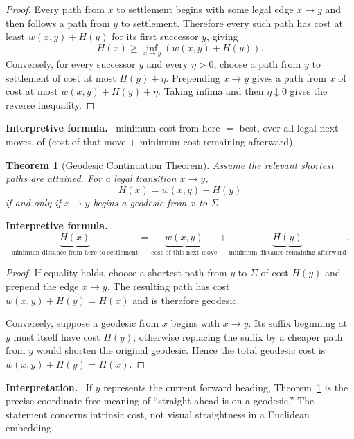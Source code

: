 \documentclass[11pt]{article}
\newtheorem{theorem}{Theorem}[section]
\theoremstyle{definition}
\theoremstyle{remark}
\newcommand{\Sett}{\Sigma}
\newenvironment{interpretiveformula}{%
  \begin{center}\begin{minipage}{0.92\textwidth}\small
  \textbf{Interpretive formula.}\ }{\end{minipage}\end{center}}
\newenvironment{interpretation}{%
  \begin{center}\begin{minipage}{0.92\textwidth}\small
  \textbf{Interpretation.}\ }{\end{minipage}\end{center}}
\begin{document}
\begin{proof}
Every path from $x$ to settlement begins with some legal edge $x\to y$ and then follows a path from $y$ to settlement. Therefore every such path has cost at least $w(x,y)+H(y)$ for its first successor $y$, giving
\[
H(x)\ge \inf_{x\to y}(w(x,y)+H(y)).
\]
Conversely, for every successor $y$ and every $\eta>0$, choose a path from $y$ to settlement of cost at most $H(y)+\eta$. Prepending $x\to y$ gives a path from $x$ of cost at most $w(x,y)+H(y)+\eta$. Taking infima and then $\eta\downarrow0$ gives the reverse inequality.
\end{proof}

\begin{interpretiveformula}
minimum cost from here $=$ best, over all legal next moves, of (cost of that move $+$ minimum cost remaining afterward).
\end{interpretiveformula}

\begin{theorem}[Geodesic Continuation Theorem]\label{thm:continuation}
Assume the relevant shortest paths are attained. For a legal transition $x\to y$,
\[
\boxed{H(x)=w(x,y)+H(y)}
\]
if and only if $x\to y$ begins a geodesic from $x$ to $\Sett$.
\end{theorem}

\begin{interpretiveformula}
\[
\underbrace{H(x)}_{\text{minimum distance from here to settlement}}
=
\underbrace{w(x,y)}_{\text{cost of this next move}}
+
\underbrace{H(y)}_{\text{minimum distance remaining afterward}}.
\]
\end{interpretiveformula}

\begin{proof}
If equality holds, choose a shortest path from $y$ to $\Sett$ of cost $H(y)$ and prepend the edge $x\to y$. The resulting path has cost $w(x,y)+H(y)=H(x)$ and is therefore geodesic.

Conversely, suppose a geodesic from $x$ begins with $x\to y$. Its suffix beginning at $y$ must itself have cost $H(y)$; otherwise replacing the suffix by a cheaper path from $y$ would shorten the original geodesic. Hence the total geodesic cost is $w(x,y)+H(y)=H(x)$.
\end{proof}

\begin{interpretation}
If $y$ represents the current forward heading, Theorem~\ref{thm:continuation} is the precise coordinate-free meaning of ``straight ahead is on a geodesic.'' The statement concerns intrinsic cost, not visual straightness in a Euclidean embedding.
\end{interpretation}
\end{document}
